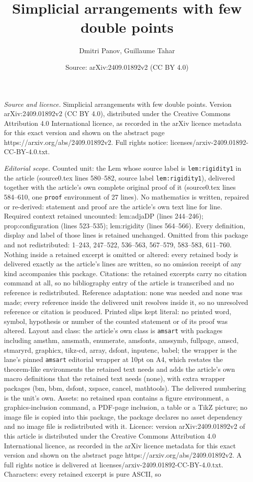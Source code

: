 \documentclass[10pt,a4paper]{amsart}
\title[Simplicial arrangements with few double points]{Simplicial arrangements with few double points}
\author{Dmitri Panov, Guillaume Tahar}
\date{Source: arXiv:2409.01892v2 (CC BY 4.0)}
\begin{document}
\maketitle

\noindent\emph{Source and licence.} Simplicial arrangements with few double points. Version arXiv:2409.01892v2 (CC BY 4.0), distributed under the Creative Commons Attribution 4.0 International licence, as recorded in the arXiv licence metadata for this exact version and shown on the abstract page https://arxiv.org/abs/2409.01892v2. Full rights notice: licenses/arxiv-2409.01892-CC-BY-4.0.txt.\par\smallskip

\noindent\textit{Editorial scope.} Counted unit: the Lem whose source label is \texttt{lem:rigidity1} in the article (source0.tex lines 580--582, source label \texttt{lem:rigidity1}), delivered together with the article's own complete original proof of it (source0.tex lines 584--610, one \texttt{proof} environment of 27 lines). No mathematics is written, repaired or re-derived: statement and proof are the article's own text line for line. Required context retained uncounted: lem:adjaDP (lines 244--246); prop:configuration (lines 523--535); lem:rigidity (lines 564--566). Every definition, display and label of those lines is retained unchanged. Omitted from this package and not redistributed: 1--243, 247--522, 536--563, 567--579, 583--583, 611--760. Nothing inside a retained excerpt is omitted or altered: every retained body is delivered exactly as the article's lines are written, so no omission receipt of any kind accompanies this package. Citations: the retained excerpts carry no citation command at all, so no bibliography entry of the article is transcribed and no reference is redistributed. Reference adaptation: none was needed and none was made; every reference inside the delivered unit resolves inside it, so no unresolved reference or citation is produced. Printed slips kept literal: no printed word, symbol, hypothesis or number of the counted statement or of its proof was altered. Layout and class: the article's own class is \texttt{amsart} with packages including amsthm, amsmath, enumerate, amsfonts, amssymb, fullpage, amscd, stmaryrd, graphicx, tikz-cd, array, dsfont, inputenc, babel; the wrapper is the lane's pinned \texttt{amsart} editorial wrapper at 10pt on A4, which restates the theorem-like environments the retained text needs and adds the article's own macro definitions that the retained text needs (none), with extra wrapper packages (bm, bbm, dsfont, xspace, cancel, mathtools). The delivered numbering is the unit's own. Assets: no retained span contains a figure environment, a graphics-inclusion command, a PDF-page inclusion, a table or a TikZ picture; no image file is copied into this package, the package declares no asset dependency and no image file is redistributed with it. Licence: version arXiv:2409.01892v2 of this article is distributed under the Creative Commons Attribution 4.0 International licence, as recorded in the arXiv licence metadata for this exact version and shown on the abstract page https://arxiv.org/abs/2409.01892v2. A full rights notice is delivered at licenses/arxiv-2409.01892-CC-BY-4.0.txt. Characters: every retained excerpt is pure ASCII, so 
\end{document}
